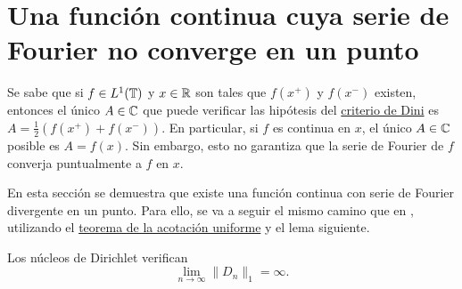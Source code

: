 \documentclass[a4paper, 12pt]{book}
\begin{document}
\section{Una función continua cuya serie de Fourier no converge en un punto}

Se sabe que si $f \in L^1(\mathbb T)$ y $x \in \mathbb R$ son tales que $f(x^+)$ y $f(x^-)$ existen, entonces el único $A \in \mathbb C$ que puede verificar las hipótesis del \hyperref[1.2.10]{criterio de Dini} es $A = \frac{1}{2}(f(x^+)+f(x^-))$. En particular, si $f$ es continua en $x$, el único $A \in \mathbb C$ posible es $A = f(x)$. Sin embargo, esto no garantiza que la serie de Fourier de $f$ converja puntualmente a $f$ en $x$.

En esta sección se demuestra que existe una función continua con serie de Fourier divergente en un punto. Para ello, se va a seguir el mismo camino que en \cite{fierros}, utilizando el \hyperref[1.3.1]{teorema de la acotación uniforme} y el lema siguiente.

\begin{lemma}\label{2.1.1}
    Los núcleos de Dirichlet verifican \[\lim_{n \to \infty} \|D_n\|_1 = \infty.\]
\end{lemma}
\end{document}
